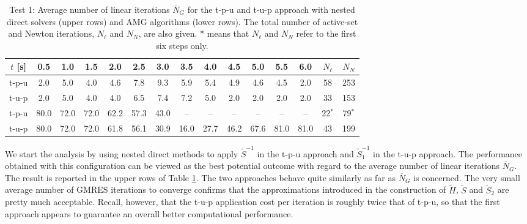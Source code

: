 \documentclass[3p,times]{elsarticle}
\theoremstyle{plain}
\newcommand{\tS}{\widetilde{S}}
\newcommand{\tH}{\widetilde{H}}
\begin{document}
\begin{table}%
  \centering
  \begin{tabular}{c|cccccccccccc|cc}
   $t$ [s] & 0.5 & 1.0 & 1.5 & 2.0 & 2.5 & 3.0 & 3.5 & 4.0 & 4.5 & 5.0 & 5.5 & 6.0 & $N_{\ell}$ & $N_N$ \\
  \hline
   t-p-u   & 2.0 & 5.0 & 4.0 & 4.6 & 7.8 & 9.3 & 5.9 & 5.4 & 4.9 & 4.6 & 4.5 & 2.0 & 58 & 253 \\
   t-u-p   & 2.0 & 5.0 & 4.0 & 4.0 & 6.5 & 7.4 & 7.2 & 5.0 & 2.0 & 2.0 & 2.0 & 2.0 & 33 & 153 \\
   \hline
   t-p-u   & 80.0 & 72.0 & 72.0 & 62.2 & 57.3 & 43.0 &   -- &   -- &   -- &   -- &   -- &   -- & 22$^*$ & 79$^*$ \\
   t-u-p   & 80.0 & 72.0 & 72.0 & 61.8 & 56.1 & 30.9 & 16.0 & 27.7 & 46.2 & 67.6 & 81.0 & 81.0 & 43 & 199 \\
  \end{tabular}
  \caption{Test 1: Average number of linear iterations $\overline{N}_G$ for the t-p-u and t-u-p approach with nested direct solvers (upper rows) and AMG algorithms (lower rows). The total number of active-set and Newton iterations, $N_{\ell}$ and $N_N$, are also given. * means that $N_{\ell}$ and $N_N$ refer to the first six steps only.}
  \label{tab:cfr_iters}
\end{table}

We start the analysis by using nested direct methods to apply $\tS^{-1}$ in the t-p-u approach and $\tS_1^{-1}$ in the t-u-p approach. The performance obtained with this configuration can be viewed as the best potential outcome with regard to the average number of linear iterations $\overline{N}_G$. The result is reported in the upper rows of Table \ref{tab:cfr_iters}.
The two approaches behave quite similarly as far as $\overline{N}_G$ %
is concerned. 
The very small average number of GMRES iterations to converge confirms that the approximations introduced in the construction of $\tH$, $\tS$ and $\tS_2$ are pretty much acceptable.
Recall, however, that the t-u-p application cost per iteration is roughly twice that of t-p-u, so that the first approach appears to guarantee an overall better computational performance.
\end{document}
